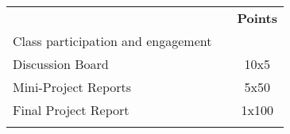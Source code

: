 \documentclass[
]{article}
\begin{document}
\begin{longtable}[]{@{}llc@{}}
\toprule
\endhead
\begin{minipage}[t]{0.46\columnwidth}\raggedright
\strut
\end{minipage} & \begin{minipage}[t]{0.15\columnwidth}\raggedright
\strut
\end{minipage} & \begin{minipage}[t]{0.31\columnwidth}\centering
\textbf{Points}\strut
\end{minipage}\tabularnewline
\begin{minipage}[t]{0.46\columnwidth}\raggedright
Class participation and engagement\strut
\end{minipage} & \begin{minipage}[t]{0.15\columnwidth}\raggedright
\strut
\end{minipage} & \begin{minipage}[t]{0.31\columnwidth}\centering
50\strut
\end{minipage}\tabularnewline
\begin{minipage}[t]{0.46\columnwidth}\raggedright
Discussion Board\strut
\end{minipage} & \begin{minipage}[t]{0.15\columnwidth}\raggedright
\strut
\end{minipage} & \begin{minipage}[t]{0.31\columnwidth}\centering
10x5\strut
\end{minipage}\tabularnewline
\begin{minipage}[t]{0.46\columnwidth}\raggedright
Mini-Project Reports\strut
\end{minipage} & \begin{minipage}[t]{0.15\columnwidth}\raggedright
\strut
\end{minipage} & \begin{minipage}[t]{0.31\columnwidth}\centering
5x50\strut
\end{minipage}\tabularnewline
\begin{minipage}[t]{0.46\columnwidth}\raggedright
Final Project Report\strut
\end{minipage} & \begin{minipage}[t]{0.15\columnwidth}\raggedright
\strut
\end{minipage} & \begin{minipage}[t]{0.31\columnwidth}\centering
1x100\strut
\end{minipage}\tabularnewline
\begin{minipage}[t]{0.46\columnwidth}\raggedright

\end{minipage}
\end{longtable}
\end{document}
